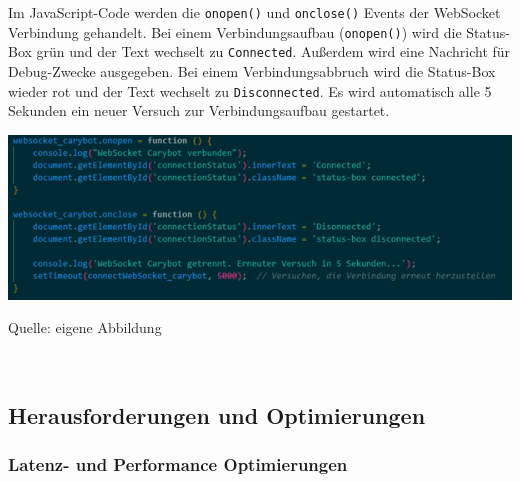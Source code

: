 \documentclass[ngerman,12pt,a4paper]{article}
\begin{document}
	Im JavaScript-Code werden die \texttt{onopen()} und \texttt{onclose()} Events der WebSocket Verbindung gehandelt. Bei einem Verbindungsaufbau (\texttt{onopen()}) wird die Status-Box grün und der Text wechselt zu \texttt{Connected}. Außerdem wird eine Nachricht für Debug-Zwecke ausgegeben. Bei einem Verbindungsabbruch wird die Status-Box wieder rot und der Text wechselt zu \texttt{Disconnected}. Es wird automatisch alle 5 Sekunden ein neuer Versuch zur Verbindungsaufbau gestartet.
	\begin{center}
		\begin{minipage}[t]{0.95\textwidth}
			\includegraphics[scale=0.9]{Pictures/status-js}
			\label{fig:status-js}
			\vspace{-10pt}
			\begin{center}
				\par\small Quelle: eigene Abbildung 
			\end{center}
		\end{minipage} \\[0.75cm]
	\end{center}
			
		\subsection{Herausforderungen und Optimierungen}
					
			\subsubsection{Latenz- und Performance Optimierungen}
			
\end{document}
